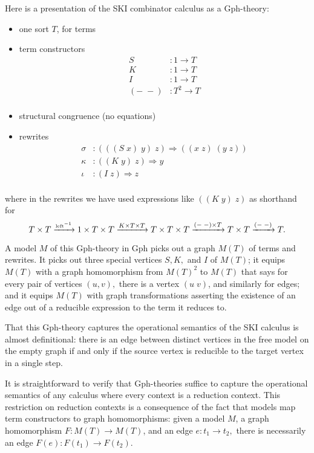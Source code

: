 \documentclass[a4paper,UKenglish]{lipics-v2016}
\newcommand{\maps}{\colon}
\begin{document}
Here is a presentation of the SKI combinator calculus as a Gph-theory:
\begin{itemize}
  \item one sort $T$, for terms
  \item term constructors
  \[\begin{array}{rl}
    S&:1 \to T\\
    K&:1 \to T\\
    I&:1 \to T\\
    (-\; -)&: T^2 \to T\\
  \end{array}\]
  \item structural congruence (no equations)
  \item rewrites
  \[\begin{array}{rl}
    \sigma&:(((S\; x)\; y)\; z) \Rightarrow ((x\; z)\; (y\; z))\\
    \kappa&:((K\; y)\; z) \Rightarrow y\\
    \iota&:(I\; z) \Rightarrow z\\
  \end{array}\]
\end{itemize}
where in the rewrites we have used expressions like $((K\; y)\; z)$ as shorthand for
\[ T\times T \xrightarrow{\mbox{\tiny left}^{-1}} 1\times T \times T \xrightarrow{K \times T \times T} T\times T \times T \xrightarrow{(-\;-)\times T} T\times T \xrightarrow{(-\;-)} T. \]

A model $M$ of this Gph-theory in Gph picks out a graph $M(T)$ of terms and rewrites.  It picks out three special vertices $S,K,$ and $I$ of $M(T)$; it equips $M(T)$ with a graph homomorphism from $M(T)^2$ to $M(T)$ that says for every pair of vertices $(u,v),$ there is a vertex $(u\;v)$, and similarly for edges; and it equips $M(T)$ with graph transformations asserting the existence of an edge out of a reducible expression to the term it reduces to.

That this Gph-theory captures the operational semantics of the SKI calculus is almost definitional: there is an edge between distinct vertices in the free model on the empty graph if and only if the source vertex is reducible to the target vertex in a single step.

It is straightforward to verify that Gph-theories suffice to capture the operational semantics of any calculus where every context is a reduction context.  This restriction on reduction contexts is a consequence of the fact that models map term constructors to graph homomorphisms: given a model $M$, a graph homomorphism $F\maps M(T) \to M(T)$, and an edge $e\maps t_1 \to t_2,$ there is necessarily an edge $F(e)\maps F(t_1) \to F(t_2).$
\end{document}
